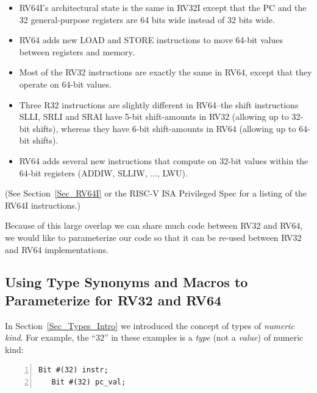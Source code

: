 \begin{itemize}

 \item RV64I's architectural state is the same in RV32I except that
       the PC and the 32 general-purpose registers are 64 bits wide
       instead of 32 bits wide.

 \item RV64 adds new LOAD and STORE instructions to move 64-bit values
       between registers and memory.

 \item Most of the RV32 instructions are exactly the same in RV64,
       except that they operate on 64-bit values.


 \item Three R32 instructions are slightly different in RV64--the
       shift instructions SLLI, SRLI and SRAI have 5-bit shift-amounts
       in RV32 (allowing up to 32-bit shifts), whereas they have 6-bit
       shift-amounts in RV64 (allowing up to 64-bit shifts).

 \item RV64 adds several new instructions that compute on 32-bit
       values within the 64-bit registers (ADDIW, SLLIW, ..., LWU).

\end{itemize}

(See Section~\ref{Sec_RV64I} or the RISC-V ISA Privileged Spec for a
listing of the RV64I instructions.)

Because of this large overlap we can share much {\BSV} code between
RV32 and RV64, {\ie} we would like to parameterize our {\BSV} code so
that it can be re-used between RV32 and RV64 implementations.


\subsection{Using Type Synonyms and Macros to Parameterize for RV32 and RV64}

\label{Sec_Type_Synonums_and_Macros}


In Section~\ref{Sec_Types_Intro} we introduced the concept of types of
\emph{numeric kind}. For example, the ``32'' in these examples is a
\emph{type} (not a \emph{value}) of numeric kind:

{\footnotesize
\begin{Verbatim}[frame=single, numbers=left]
   Bit #(32) instr;
   Bit #(32) pc_val;
\end{Verbatim}
}

